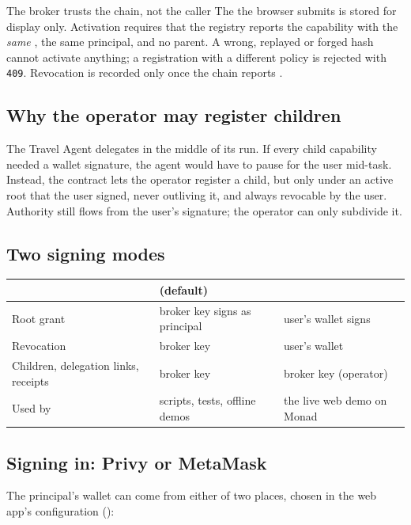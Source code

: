 \documentclass[11pt,a4paper]{article}
\begin{document}
\begin{keyidea}{The broker trusts the chain, not the caller}
The  the browser submits is stored for display only. Activation requires that the registry reports the capability  with the \emph{same} , the same principal, and no parent. A wrong, replayed or forged hash cannot activate anything; a registration with a different policy is rejected with \texttt{409}. Revocation is recorded only once the chain reports .
\end{keyidea}

\subsection{Why the operator may register children}
The Travel Agent delegates in the middle of its run. If every child capability needed a wallet signature, the agent would have to pause for the user mid-task. Instead, the contract lets the operator register a child, but only under an active root that the user signed, never outliving it, and always revocable by the user. Authority still flows from the user's signature; the operator can only subdivide it.

\subsection{Two signing modes}
\begin{center}
\renewcommand{\arraystretch}{1.3}
\small
\begin{tabularx}{\textwidth}{@{}l Y Y@{}}
\toprule
 & \textbf{ (default)} & \textbf{}\\
\midrule
Root grant & broker key signs as principal & user's wallet signs\\
Revocation & broker key & user's wallet\\
Children, delegation links, receipts & broker key & broker key (operator)\\
Used by & scripts, tests, offline demos & the live web demo on Monad\\
\bottomrule
\end{tabularx}
\end{center}

\subsection{Signing in: Privy or MetaMask}
The principal's wallet can come from either of two places, chosen in the web app's configuration ():
\end{document}
